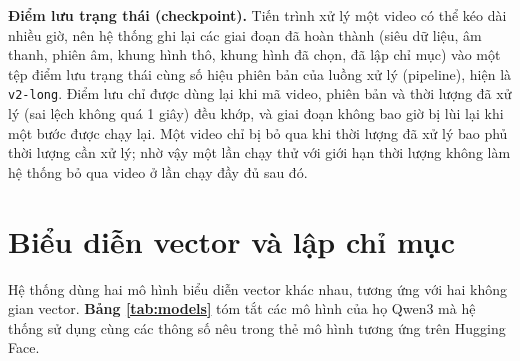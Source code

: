 \bigbreak\noindent
\textbf{Điểm lưu trạng thái (checkpoint).} Tiến trình xử lý một video có thể kéo dài nhiều giờ, nên hệ thống ghi lại các giai đoạn đã hoàn thành (siêu dữ liệu, âm thanh, phiên âm, khung hình thô, khung hình đã chọn, đã lập chỉ mục) vào một tệp điểm lưu trạng thái cùng số hiệu phiên bản của luồng xử lý (pipeline), hiện là \texttt{v2-long}. Điểm lưu chỉ được dùng lại khi mã video, phiên bản và thời lượng đã xử lý (sai lệch không quá 1 giây) đều khớp, và giai đoạn không bao giờ bị lùi lại khi một bước được chạy lại. Một video chỉ bị bỏ qua khi thời lượng đã xử lý bao phủ thời lượng cần xử lý; nhờ vậy một lần chạy thử với giới hạn thời lượng không làm hệ thống bỏ qua video ở lần chạy đầy đủ sau đó.


\section{Biểu diễn vector và lập chỉ mục}\label{sec:index}

Hệ thống dùng hai mô hình biểu diễn vector khác nhau, tương ứng với hai không gian vector. \textbf{Bảng \ref{tab:models}} tóm tắt các mô hình của họ Qwen3 mà hệ thống sử dụng cùng các thông số nêu trong thẻ mô hình tương ứng trên Hugging Face.


